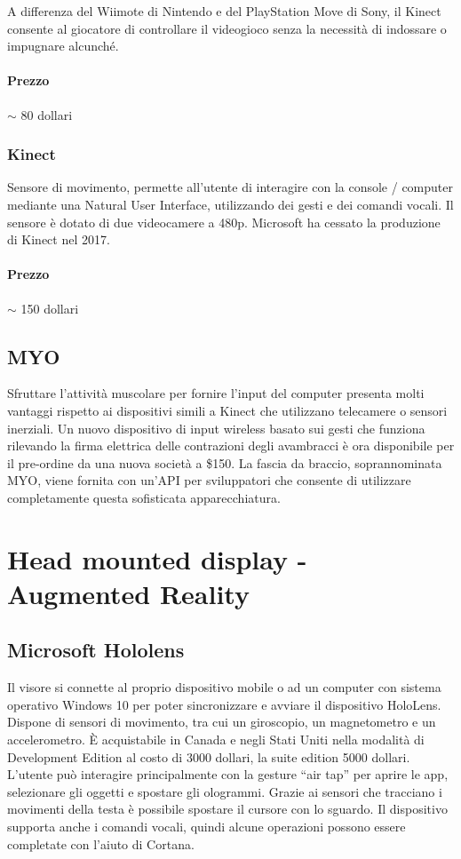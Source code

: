 \documentclass[8pt]{extarticle}
\begin{document}
\begin{multicols}{3}
A differenza del Wiimote di Nintendo e del PlayStation Move di Sony, il Kinect consente al giocatore di controllare
il videogioco senza la necessità di indossare o impugnare alcunché.

\paragraph{Prezzo} $\sim$ 80 dollari


\subsubsection{Kinect}
Sensore di movimento, permette all'utente di interagire con la console / computer mediante una Natural User Interface,
utilizzando dei gesti e dei comandi vocali.
Il sensore è dotato di due videocamere a 480p.
Microsoft ha cessato la produzione di Kinect nel 2017.

\paragraph{Prezzo} $\sim$ 150 dollari

\subsection{MYO}
Sfruttare l'attività muscolare per fornire l'input del computer presenta molti vantaggi rispetto ai dispositivi simili a Kinect che utilizzano telecamere o sensori inerziali. Un nuovo dispositivo di input wireless basato sui gesti che funziona rilevando la firma elettrica delle contrazioni degli avambracci è ora disponibile per il pre-ordine da una nuova società a \$150. La fascia da braccio, soprannominata MYO, viene fornita con un'API per sviluppatori che consente di utilizzare completamente questa sofisticata apparecchiatura.

\section{Head mounted display - Augmented Reality}
\subsection{Microsoft Hololens}
Il visore si connette al proprio dispositivo mobile o ad un computer con sistema operativo Windows 10 per poter sincronizzare e avviare il dispositivo HoloLens.
Dispone di sensori di movimento, tra cui un giroscopio, un magnetometro e un accelerometro.
È acquistabile in Canada e negli Stati Uniti nella modalità di Development Edition al costo di 3000 dollari, la suite edition 5000 dollari.
L’utente può interagire principalmente con la gesture “air tap” per aprire le app, selezionare gli oggetti e spostare gli ologrammi. Grazie ai sensori che tracciano i movimenti della testa è possibile spostare il cursore con lo sguardo. Il dispositivo supporta anche i comandi vocali, quindi alcune operazioni possono essere completate con l’aiuto di Cortana.

\end{multicols}
\end{document}
